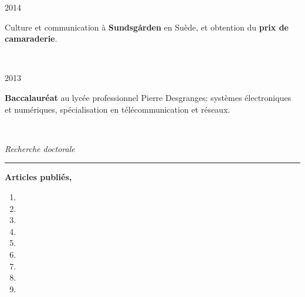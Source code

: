 {	\noindent
	\begin{minipage}{0.20\textwidth}
		\color{MyGray} 2014
	\end{minipage}
	\hfill
	\begin{minipage}{0.70\textwidth}
		Culture et communication à \textbf{Sundsgården} en Suède, et obtention du \textbf{prix de camaraderie}.
	\end{minipage}\\
	\vspace{2mm}
	
	\noindent
	\begin{minipage}{0.20\textwidth}
		\color{MyGray} 2013
	\end{minipage}
	\hfill
	\begin{minipage}{0.70\textwidth}
		\textbf{Baccalauréat} au lycée professionnel Pierre Desgranges: systèmes électroniques et numériques, spécialisation en télécommunication et réseaux.
	\end{minipage}\\
	\vspace{5mm}
	
	\noindent
	\textit{\Large \color{MyGray} \hspace{5mm} Recherche doctorale}
	\vspace{2mm}
	{\color{DefaultGray}\hrule height .1pt}
	\vspace{4mm}
	
	\textbf{Articles publiés,}
	\begin{enumerate}
		\item {}
		\item {}
		\item {}
		\item {}
		\item {}
		\item {}
		\item {}
		\item {}
		\item {}
	\end{enumerate}
	\vspace{5mm}
	
	
}
